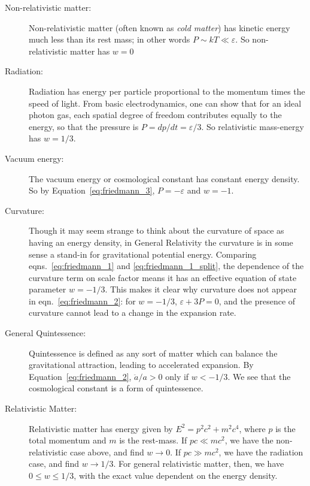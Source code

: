 \begin{description}
  \item[Non-relativistic matter:] Non-relativistic matter (often known
    as {\it cold matter}) has kinetic energy much less than its rest mass;
    in other words $P \sim kT \ll \varepsilon$.  So non-relativistic matter
    has $w = 0$
  \item[Radiation:] Radiation has energy per particle
    proportional to the momentum times the speed of light.  From basic
    electrodynamics, one can show that for an ideal photon gas, each spatial
    degree of freedom contributes equally to the energy, so that the pressure
    is $P = dp/dt = \varepsilon / 3$.  So relativistic mass-energy has
    $w = 1/3$.
  \item[Vacuum energy:] The vacuum energy or cosmological constant has
    constant energy density.  So by Equation~\ref{eq:friedmann_3},
    $P = -\varepsilon$ and $w = -1$.
  \item[Curvature:] Though it may seem strange to think about the curvature
    of space as having an energy density, in General Relativity the curvature
    is in some sense a stand-in for gravitational potential energy.  Comparing
    eqns.~\ref{eq:friedmann_1} and \ref{eq:friedmann_1_split}, the dependence
    of the curvature term on scale factor means it has an effective equation
    of state parameter $w = -1/3$.  This makes it clear why curvature does
    not appear in eqn.~\ref{eq:friedmann_2}: for $w=-1/3$,
    $\varepsilon + 3P = 0$, and the presence of curvature cannot lead to
    a change in the expansion rate.
  \item[General Quintessence:] Quintessence is defined as any sort of matter
    which can balance the gravitational attraction, leading to accelerated
    expansion.  By Equation~\ref{eq:friedmann_2}, $\ddot{a}/a > 0$ only
    if $w < - 1/3$.  We see that the cosmological constant is a form of
    quintessence.
  \item[Relativistic Matter:] Relativistic matter has energy given by
    $E^2 = p^2c^2 + m^2 c^4$, where $p$ is the total momentum and $m$ is
    the rest-mass.  If $pc \ll mc^2$, we have the non-relativistic
    case above, and find $w \to 0$.  If $pc \gg mc^2$, we have the radiation
    case, and find $w \to 1/3$.  For general relativistic matter, then, we have
    $0 \le w \le 1/3$, with the exact value dependent on the energy density.
\end{description}

